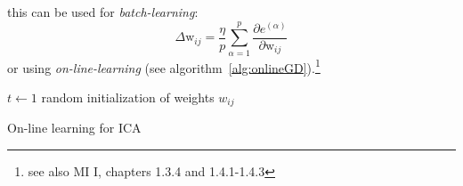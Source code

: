 this can be used for \emph{batch-learning}:
\begin{equation}
	\Delta \mathrm{w}_{ij}
	= \frac{\eta}{p} \sum\limits_{\alpha = 1}^p 
	\frac{\partial e^{(\alpha)}}{\partial \mathrm{w}_{ij}}
\end{equation}
or using \emph{on-line-learning} (see algorithm~\ref{alg:onlineGD}).\footnote{see also MI I, chapters 1.3.4 and 1.4.1-1.4.3}
\begin{algorithm}
  \DontPrintSemicolon
  $t \leftarrow 1$\;
  random initialization of weights $w_{ij}$\;
\caption{On-line learning for ICA}
\label{alg:onlineGD}
\end{algorithm}


